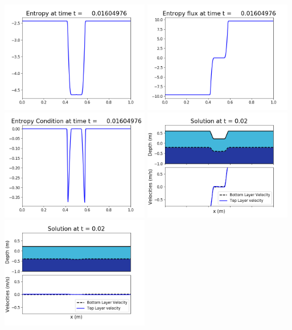\documentclass[11pt]{article}
\begin{document}
\vskip 10pt 
\includegraphics[width=0.475\textwidth]{frame0045fig1007.png}
\includegraphics[width=0.475\textwidth]{frame0045fig1008.png}
\vskip 10pt 
\includegraphics[width=0.475\textwidth]{frame0045fig1009.png}
\vskip 10pt 
\includegraphics[width=0.475\textwidth]{frame0046fig1001.png}
\includegraphics[width=0.475\textwidth]{frame0046fig1002.png}
\end{document}
